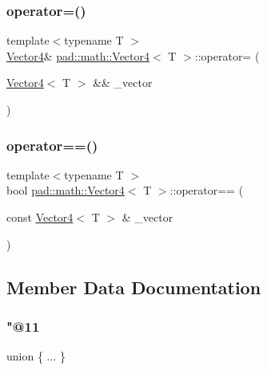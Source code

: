 \subsubsection{\texorpdfstring{operator=()}{operator=()}\hspace{0.1cm}{\footnotesize\ttfamily [2/2]}}
{\footnotesize\ttfamily template$<$typename T $>$ \\
\mbox{\hyperlink{structpad_1_1math_1_1_vector4}{Vector4}}\& \mbox{\hyperlink{structpad_1_1math_1_1_vector4}{pad\+::math\+::\+Vector4}}$<$ T $>$\+::operator= (\begin{DoxyParamCaption}\item[{\mbox{\hyperlink{structpad_1_1math_1_1_vector4}{Vector4}}$<$ T $>$ \&\&}]{\+\_\+vector }\end{DoxyParamCaption})\hspace{0.3cm}{\ttfamily [default]}}

\mbox{\label{structpad_1_1math_1_1_vector4_afe872f9553149f12674806bb6e7eb786}} 
\subsubsection{\texorpdfstring{operator==()}{operator==()}}
{\footnotesize\ttfamily template$<$typename T $>$ \\
bool \mbox{\hyperlink{structpad_1_1math_1_1_vector4}{pad\+::math\+::\+Vector4}}$<$ T $>$\+::operator== (\begin{DoxyParamCaption}\item[{const \mbox{\hyperlink{structpad_1_1math_1_1_vector4}{Vector4}}$<$ T $>$ \&}]{\+\_\+vector }\end{DoxyParamCaption})}



\subsection{Member Data Documentation}
\mbox{\label{structpad_1_1math_1_1_vector4_ab20659ceb49f902c572024d22deea016}} 
\subsubsection{\texorpdfstring{"@11}{@11}}
{\footnotesize\ttfamily union \{ ... \} }


